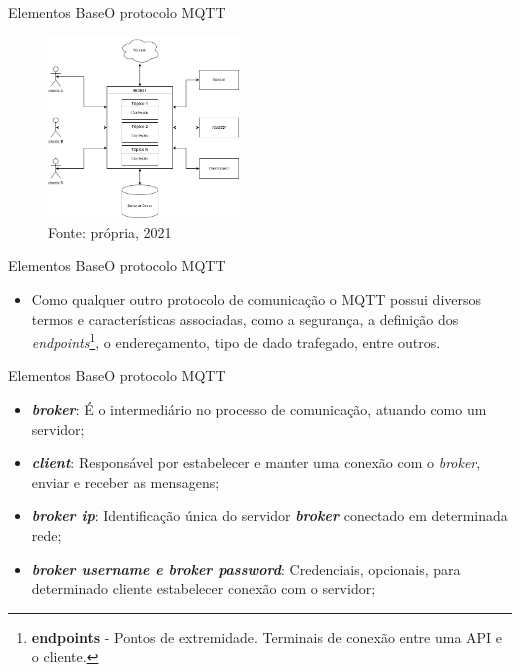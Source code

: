 \begin{frame}{Elementos Base}{O protocolo MQTT}

    \begin{figure}[H]
        \centering
        \caption{Diagrama básico MQTT}
        \includegraphics[width=0.45\textwidth]{figuras/mqtt.drawio.png}
        \caption*{\small{Fonte: própria, 2021}}
        \label{fig:mqtt_diagram}
    \end{figure}

\end{frame}

\begin{frame}{Elementos Base}{O protocolo MQTT}
    \begin{itemize}
        \item Como qualquer outro protocolo de comunicação o MQTT possui diversos termos e características associadas, como a segurança, a definição dos \textit{endpoints}\footnote{\textbf{endpoints} - Pontos de extremidade. Terminais de conexão entre uma API e o cliente.}, o endereçamento, tipo de dado trafegado, entre outros.
    \end{itemize}

\end{frame}

\begin{frame}{Elementos Base}{O protocolo MQTT}
    \begin{itemize}
        \item \textbf{\textit{broker}}: É o intermediário no processo de comunicação, atuando como um servidor;
        \item \textbf{\textit{client}}: Responsável por estabelecer e manter uma conexão com o \textit{broker}, enviar e receber as mensagens;
        \item \textit{\textbf{broker ip}}: Identificação única do servidor \textit{\textbf{broker}} conectado em determinada rede;
        \item \textbf{\textit{broker username e broker password}}: Credenciais, opcionais, para determinado cliente estabelecer conexão com o servidor; 
    \end{itemize}

\end{frame}

